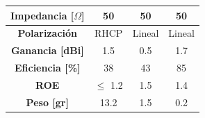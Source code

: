 \begin{table}[H]
\begin{tabular}{|c|c|c|c}
\textbf{Impedancia [$\Omega$]}                                              & 50                                                                                                 & 50                                                                                      & \multicolumn{1}{c|}{50} 		                                                                                                    \\ \hline
\textbf{Polarización}                                                       & RHCP                                                                                               & Lineal                                                                                  & \multicolumn{1}{c|}{Lineal}    		                                                                                            \\ \hline
\textbf{Ganancia [dBi]}                                                     & 1.5                                                                                                & 0.5                                                                                     & \multicolumn{1}{c|}{1.7}               		                                                                                    \\ \hline
\textbf{Eficiencia [\%]}                                                    & 38                                                                                                 & 43                                                                                      & \multicolumn{1}{c|}{85}                        	  	                                                                            \\ \hline
\textbf{ROE}                                                                & $\leq$ 1.2                                                                                           & 1.5                                                                                   & \multicolumn{1}{c|}{1.4}                               		                                                                    \\ \hline
\textbf{Peso [gr]}                                                          & 13.2                                                                                               & 1.5                                                                                     & \multicolumn{1}{c|}{0.2}                                                  		                                                    \\ \hline

\end{tabular}
\end{table}
